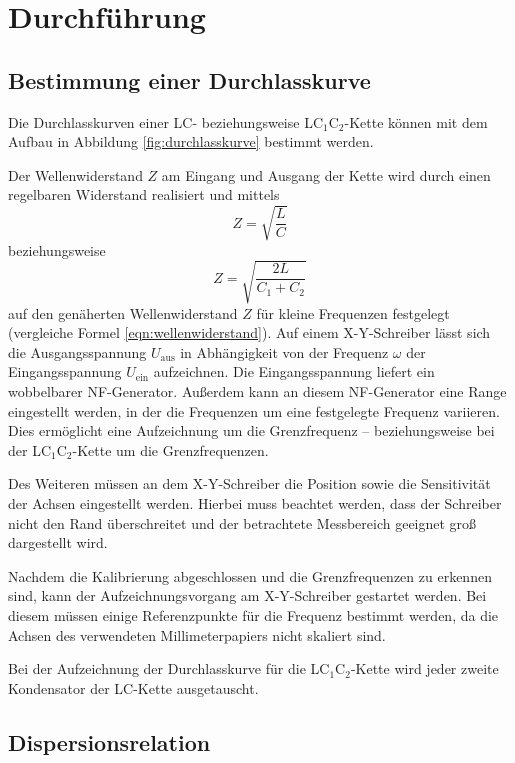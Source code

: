 \section{Durchführung}
\label{sec:Durchführung}

\subsection{Bestimmung einer Durchlasskurve}
Die Durchlasskurven einer LC- beziehungsweise LC$_1$C$_2$-Kette können
mit dem Aufbau in Abbildung \ref{fig:durchlasskurve} bestimmt werden.

Der Wellenwiderstand $Z$ am Eingang und Ausgang der Kette wird durch einen
regelbaren Widerstand realisiert und mittels
\begin{equation}
	Z = \sqrt{\frac{L}{C}}
\end{equation}
beziehungsweise
\begin{equation}
	Z = \sqrt{\frac{2L}{C_1+C_2}}
\end{equation}
auf den genäherten Wellenwiderstand $Z$ für kleine Frequenzen festgelegt (vergleiche Formel \eqref{eqn:wellenwiderstand}).
Auf einem X-Y-Schreiber lässt sich die Ausgangsspannung $U_{\text{aus}}$ in Abhängigkeit von der Frequenz $\omega$ der Eingangsspannung $U_{\text{ein}}$ aufzeichnen.
Die Eingangsspannung liefert ein wobbelbarer NF-Generator.
Außerdem kann an diesem NF-Generator eine Range eingestellt werden, in der die Frequenzen um eine festgelegte Frequenz variieren.
Dies ermöglicht eine Aufzeichnung um die Grenzfrequenz -- beziehungsweise 
bei der LC$_1$C$_2$-Kette um die Grenzfrequenzen.

Des Weiteren müssen an dem X-Y-Schreiber die Position sowie die Sensitivität der Achsen eingestellt werden.
Hierbei muss beachtet werden, dass der Schreiber nicht den Rand überschreitet und der betrachtete Messbereich geeignet groß dargestellt wird.

Nachdem die Kalibrierung abgeschlossen und die Grenzfrequenzen zu erkennen sind, kann der Aufzeichnungsvorgang am X-Y-Schreiber gestartet werden.
Bei diesem müssen einige Referenzpunkte für die Frequenz bestimmt werden, 
da die Achsen des verwendeten Millimeterpapiers nicht skaliert sind.

Bei der Aufzeichnung der Durchlasskurve für die LC$_1$C$_2$-Kette wird jeder zweite Kondensator der LC-Kette ausgetauscht.


\subsection{Dispersionsrelation}
\label{sec:dispi}

